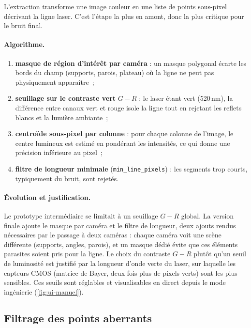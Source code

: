 L'extraction transforme une image couleur en une liste de points sous-pixel
décrivant la ligne laser. C'est l'étape la plus en amont, donc la plus
critique pour le bruit final.

\paragraph{Algorithme.}
\begin{enumerate}
  \item \textbf{masque de région d'intérêt par caméra} : un masque polygonal
        écarte les bords du champ (supports, parois, plateau) où la ligne ne
        peut pas physiquement apparaître~;
  \item \textbf{seuillage sur le contraste vert} $G-R$ : le laser étant vert
        (520\,nm), la différence entre canaux vert et rouge isole la ligne tout
        en rejetant les reflets blancs et la lumière ambiante~;
  \item \textbf{centroïde sous-pixel par colonne} : pour chaque colonne de
        l'image, le centre lumineux est estimé en pondérant les intensités, ce
        qui donne une précision inférieure au pixel~;
  \item \textbf{filtre de longueur minimale} (\texttt{min\_line\_pixels}) : les
        segments trop courts, typiquement du bruit, sont rejetés.
\end{enumerate}

\paragraph{Évolution et justification.}
Le prototype intermédiaire se limitait à un seuillage $G-R$ global. La version
finale ajoute le masque par caméra et le filtre de longueur, deux ajouts rendus
nécessaires par le passage à deux caméras : chaque caméra voit une scène
différente (supports, angles, parois), et un masque dédié évite que ces
éléments parasites soient pris pour la ligne. Le choix du contraste $G-R$ plutôt
qu'un seuil de luminosité est justifié par la longueur d'onde verte du laser,
sur laquelle les capteurs CMOS (matrice de Bayer, deux fois plus de pixels
verts) sont les plus sensibles. Ces seuils sont réglables et visualisables en
direct depuis le mode ingénierie (\autoref{fig:ui-manuel}).

\subsection{Filtrage des points aberrants}

